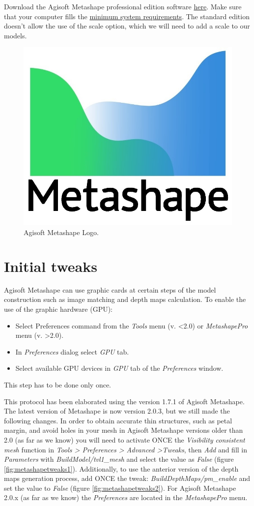 \documentclass[
]{book}
\begin{document}
Download the Agisoft Metashape professional edition software
\href{https://www.agisoft.com/downloads/installer/}{here}. Make sure that
your computer fills the \href{https://www.agisoft.com/downloads/system-requirements/}{minimum system requirements}.
The standard edition doesn't allow the use of the scale option, which we
will need to add a scale to our models.

\begin{figure}

{\centering \includegraphics[width=0.2\linewidth]{Figures/logo_metashape} 

}

\caption{Agisoft Metashape Logo.}\label{fig:agisoft}
\end{figure}

\hypertarget{initial-tweaks}{%
\section{Initial tweaks}\label{initial-tweaks}}

Agisoft Metashape can use graphic cards at certain steps of the model
construction such as image matching and depth maps calculation. To
enable the use of the graphic hardware (GPU):

\begin{itemize}
\item
  Select Preferences command from the \emph{Tools} menu (v. \textless2.0) or \emph{MetashapePro} menu (v. \textgreater2.0).
\item
  In \emph{Preferences} dialog select \emph{GPU} tab.
\item
  Select available GPU devices in \emph{GPU} tab of the \emph{Preferences} window.
\end{itemize}

This step has to be done only once.

This protocol has been elaborated using the version 1.7.1 of Agisoft
Metashape. The latest version of Metashape is now version 2.0.3, but we
still made the following changes. In order to obtain accurate thin
structures, such as petal margin, and avoid holes in your mesh in
Agisoft Metashape versions older than 2.0 (as far as we know) you will need to
activate ONCE the \emph{Visibility consistent mesh} function in \emph{Tools \textgreater{} Preferences \textgreater{} Advanced \textgreater Tweaks},
then \emph{Add} and fill in \emph{Parameters} with \emph{BuildModel/tvl1\_mesh} and select the
value as \emph{False} (figure \ref{fig:metashapetweaks1}). Additionally, to use the
anterior version of the depth maps generation process, add ONCE the tweak:
\emph{BuildDepthMaps/pm\_enable} and set the value to \emph{False} (figure \ref{fig:metashapetweaks2}).
For Agisoft Metashape 2.0.x (as far as we know) the \emph{Preferences} are located in the \emph{MetashapePro} menu.
\end{document}

